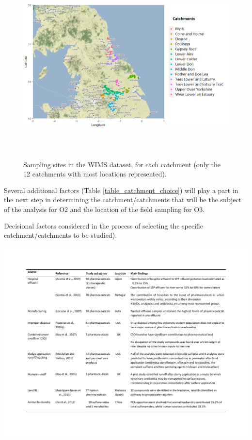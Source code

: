\documentclass{article}
\begin{document}
\begin{figure}
    \centering
    \includegraphics[height=10cm]{fig_catchments_map.png}
    \caption{Sampling sites in the WIMS dataset, for each catchment (only the 12 catchments with most locations represented).}
    \label{fig_WIMS_locations}
\end{figure}

Several additional factors (Table \ref{table_catchment_choice}) will play a part in the next step in determining the catchment/catchments that will be the subject of the analysis for O2 and the location of the field sampling for O3.

\begin{table}[!h]
    \centering
    \caption{Decisional factors considered in the process of selecting the specific catchment/catchments to be studied).}
    \includegraphics[page=2,width=\linewidth,trim=2cm 18cm 2cm 3cm, clip]{just tables.pdf}
    \label{table_catchment_choice}
\end{table}
\end{document}
